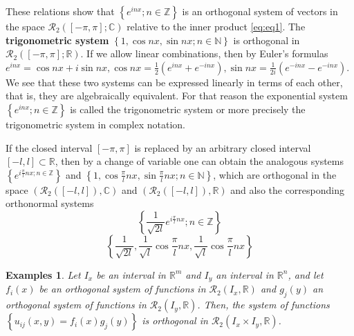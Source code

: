 \documentclass[a4paper,12pt]{article}
\newtheorem{example}{Examples}
\begin{document}
    These relations show that $\displaystyle \left\{e^{inx}; n \in \mathbb{Z}\right\}$ 
    is an orthogonal system of vectors in the space $\mathcal{R}_2\left([-\pi, 
    \pi]; \mathbb{C}\right)$ relative to the inner product \ref{eq:eq1}. 
    The \textbf{trigonometric system} $\displaystyle \left\{1, \cos nx, \sin nx; n \in 
    \mathbb{N}\right\}$ is orthogonal in $\mathcal{R}_2\left([-\pi, \pi]; \mathbb{R}\right)$.
    If we allow linear combinations, then by Euler's formulas $\displaystyle e^{inx} 
    = \cos nx + i \sin nx, \cos nx = \frac{1}{2} \left(e^{inx} + e^{-inx}\right), 
    \sin nx= \frac{1}{2i}\left(e^{-inx} - e^{-inx}\right)$. We see that these two systems 
    can be expressed linearly in terms of each other, that is, they are algebraically 
    equivalent. For that reason the exponential system $\displaystyle \left\{ e^{inx};
    n \in \mathbb{Z} \right\}$ is called the trigonometric system or more precisely 
    the trigonometric system in complex notation.

    If the closed interval $[-\pi, \pi]$ is replaced by an arbitrary 
    closed interval $[-l, l] \subset \mathbb{R}$, then by a change of 
    variable one can obtain the analogous systems 
    $\displaystyle \left\{e^{i\frac{\pi}{l}nx; n \in \mathbb{Z}}\right\}$
    and $\displaystyle \left\{1, \cos \frac{\pi}{l}nx, \sin \frac{\pi}{l}nx; 
    n \in \mathbb{N}\right\}$, which are orthogonal in the space 
    $\left(\mathcal{R}_2([-l, l]),\mathbb{C}\right)$ and $\displaystyle 
    \left(\mathcal{R}_2([-l, l]), \mathbb{R}\right)$
    and also the corresponding orthonormal systems 
    \[
        \left\{\frac{1}{\sqrt{2l}}e^{i\frac{\pi}{l}nx}; n \in \mathbb{Z}\right\}
    \]
    \[
        \left\{\frac{1}{\sqrt{2l}}, \frac{1}{\sqrt{l}}\cos \frac{\pi}{l}nx, 
        \frac{1}{\sqrt{l}}\cos \frac{\pi}{l}nx \right\}
    \]

    \begin{example}
        Let $I_x$ be an interval in $\mathbb{R}^m$ and $I_y$ an interval 
        in $\mathbb{R}^n$, and let $f_i(x)$ be an orthogonal system of 
        functions in $\mathcal{R}_2(I_x, \mathbb{R})$ and $g_j(y)$ an 
        orthogonal system of functions in $\mathcal{R}_2(I_y, \mathbb{R})$.
        Then, the system of functions $\displaystyle \left\{u_{ij}(x,y) = 
        f_i(x)g_j(y)\right\}$ is orthogonal in $\mathcal{R}_2(I_x \times I_y, \mathbb{R})$.
    \end{example}
\end{document}
